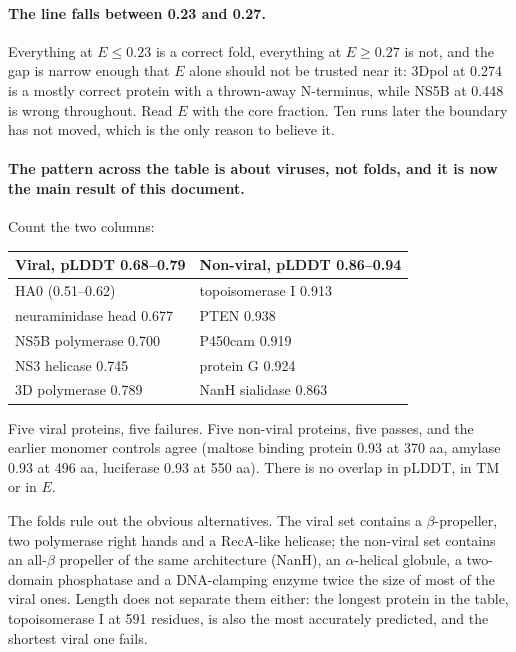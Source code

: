 \documentclass[11pt,a4paper]{article}
\begin{document}
\paragraph{The line falls between 0.23 and 0.27.} Everything at $E \le 0.23$ is a
correct fold, everything at $E \ge 0.27$ is not, and the gap is narrow enough
that $E$ alone should not be trusted near it: 3Dpol at 0.274 is a mostly correct
protein with a thrown-away N-terminus, while NS5B at 0.448 is wrong throughout.
Read $E$ with the core fraction. Ten runs later the boundary has not moved,
which is the only reason to believe it.

\paragraph{The pattern across the table is about viruses, not folds, and it is
now the main result of this document.} Count the two columns:

\begin{center}
\begin{tabular}{l l}
\toprule
Viral, pLDDT 0.68--0.79 & Non-viral, pLDDT 0.86--0.94 \\
\midrule
HA0 (0.51--0.62) & topoisomerase I 0.913 \\
neuraminidase head 0.677 & PTEN 0.938 \\
NS5B polymerase 0.700 & P450cam 0.919 \\
NS3 helicase 0.745 & protein G 0.924 \\
3D polymerase 0.789 & NanH sialidase 0.863 \\
\bottomrule
\end{tabular}
\end{center}

\noindent Five viral proteins, five failures. Five non-viral proteins, five
passes, and the earlier monomer controls agree (maltose binding protein 0.93 at
370 aa, amylase 0.93 at 496 aa, luciferase 0.93 at 550 aa). There is no overlap
in pLDDT, in TM or in $E$.

The folds rule out the obvious alternatives. The viral set contains a
$\beta$-propeller, two polymerase right hands and a RecA-like helicase; the
non-viral set contains an all-$\beta$ propeller of the same architecture
(NanH), an $\alpha$-helical globule, a two-domain phosphatase and a
DNA-clamping enzyme twice the size of most of the viral ones. Length does not
separate them either: the longest protein in the table, topoisomerase I at 591
residues, is also the most accurately predicted, and the shortest viral one
fails.
\end{document}
